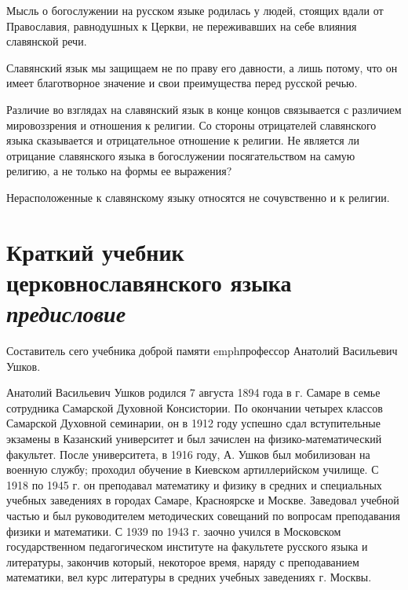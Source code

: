 \documentclass[11pt,a4paper,oneside]{memoir}
\begin{document}
    Мысль о богослужении на русском языке родилась у людей, стоящих вдали от Православия, равнодушных к Церкви, не переживавших на себе влияния славянской речи.
    
    Славянский язык мы защищаем не по праву его давности, а лишь потому, что он имеет благотворное значение и свои преимущества перед русской речью.
    
    Различие во взглядах на славянский язык в конце концов связывается с различием мировоззрения и отношения к религии. Со стороны отрицателей славянского языка сказывается и отрицательное отношение к религии. Не является ли отрицание славянского языка в богослужении посягательством на самую религию, а не только на формы ее выражения?
    
    Нерасположенные к славянскому языку относятся не сочувственно и к религии.
    
    \section*{Краткий учебник церковнославянского языка\\
        \emph{предисловие}}
    \label{sec:brief}
    
    Составитель сего учебника доброй памяти emph{профессор Анатолий Васильевич Ушков}.
    
    Анатолий Васильевич Ушков родился 7 августа 1894 года в г. Самаре в семье сотрудника Самарской Духовной Консистории. По окончании четырех классов Самарской Духовной семинарии, он в 1912 году успешно сдал вступительные экзамены в Казанский университет и был зачислен на физико-математический факультет. После университета, в 1916 году, А. Ушков был мобилизован на военную службу; проходил обучение в Киевском артиллерийском училище. С 1918 по 1945 г. он преподавал математику и физику в средних и специальных учебных заведениях в городах Самаре, Красноярске и Москве. Заведовал учебной частью и был руководителем методических совещаний по вопросам преподавания физики и математики. С 1939 по 1943 г. заочно учился в Московском государственном педагогическом институте на факультете русского языка и литературы, закончив который, некоторое время, наряду с преподаванием математики, вел курс литературы в средних учебных заведениях г. Москвы.
    
\end{document}
